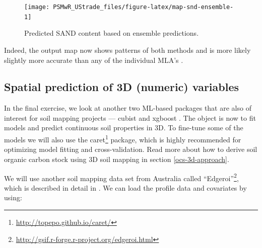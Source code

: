 \documentclass[graybox,natbib,nospthms,UStrade]{svmono}
\newenvironment{Shaded}{\begin{snugshade}}{\end{snugshade}}
\newcommand{\ErrorTok}[1]{\textcolor[rgb]{0.14,0.14,0.14}{\textbf{#1}}}
\newcommand{\KeywordTok}[1]{\textcolor[rgb]{0.27,0.27,0.27}{\textbf{#1}}}
\newcommand{\NormalTok}[1]{#1}
\newcommand{\OperatorTok}[1]{\textcolor[rgb]{0.43,0.43,0.43}{\textbf{#1}}}
\newcommand{\StringTok}[1]{\textcolor[rgb]{0.5,0.5,0.5}{#1}}
\renewcommand{\href}[2]{#2 (\url{#1})}
\renewcommand{\href}[2]{#2\footnote{\url{#1}}}
\begin{document}
\begin{figure}[H]

{\centering \texttt{[image: PSMwR\_UStrade\_files/figure-latex/map-snd-ensemble-1]} 

}

\caption{Predicted SAND content based on ensemble predictions.}\label{fig:map-snd-ensemble}
\end{figure}

Indeed, the output map now shows patterns of both methods and is more likely slightly more accurate than any of the individual MLA's \citep{krogh1996learning}.

\hypertarget{prediction-3D}{%
\subsection{Spatial prediction of 3D (numeric) variables}\label{prediction-3D}}

In the final exercise, we look at another two ML-based packages that are also of interest for soil mapping projects --- cubist \citep{kuhn2012cubist, kuhn2013applied} and xgboost \citep{2016arXiv160302754C}. The object is now to fit models and predict continuous soil properties in 3D. To fine-tune some of the models we will also use the \href{http://topepo.github.io/caret/}{caret} package, which is highly recommended for optimizing model fitting and cross-validation. Read more about how to derive soil organic carbon stock using 3D soil mapping in section \ref{ocs-3d-approach}.

We will use another soil mapping data set from Australia called \href{http://gsif.r-forge.r-project.org/edgeroi.html}{``Edgeroi''}, which is described in detail in \citet{Malone2009Geoderma}. We can load the profile data and covariates by using:

\begin{Shaded}
\end{Shaded}
\end{document}
